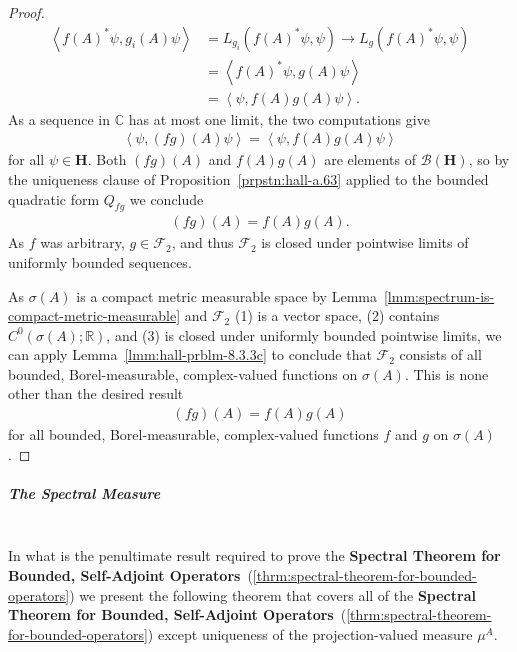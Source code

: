 \begin{proof}
\begin{align}
    \left< f(A)^*\psi, g_i(A)\psi \right> &= L_{g_i}(f(A)^*\psi, \psi) \longrightarrow L_g(f(A)^*\psi, \psi) \\
                &= \left< f(A)^*\psi, g(A)\psi \right> \\
                &= \left< \psi, f(A)g(A)\psi \right>.
\end{align}
As a sequence in $\mathbb{C}$ has at most one limit, the two computations give
\begin{align}
    \left< \psi, (fg)(A)\psi \right> = \left< \psi, f(A)g(A)\psi \right>
\end{align}
for all $\psi \in \mathbf{H}$. Both $(fg)(A)$ and $f(A)g(A)$ are elements of $\mathcal{B}(\mathbf{H})$, so by the uniqueness clause of Proposition~\ref{prpstn:hall-a.63} applied to the bounded quadratic form $Q_{fg}$ we conclude
\begin{align}
    (fg)(A) = f(A)g(A).
\end{align}
As $f$ was arbitrary, $g \in \mathcal{F}_2$, and thus $\mathcal{F}_2$ is closed under pointwise limits of uniformly bounded sequences.

As $\sigma(A)$ is a compact metric measurable space by Lemma~\ref{lmm:spectrum-is-compact-metric-measurable} and $\mathcal{F}_2$ (1) is a vector space, (2) contains $C^0(\sigma(A); \mathbb{R})$, and (3) is closed under uniformly bounded pointwise limits, we can apply Lemma~\ref{lmm:hall-prblm-8.3.3c} to conclude that $\mathcal{F}_2$ consists of all bounded, Borel-measurable, complex-valued functions on $\sigma(A)$. This is none other than the desired result
\begin{align}
    (fg)(A) = f(A)g(A)
\end{align}
for all bounded, Borel-measurable, complex-valued functions $f$ and $g$ on $\sigma(A)$.
\end{proof}

\subparagraph{The Spectral Measure}\mbox{}\\
In what is the penultimate result required to prove the \textbf{Spectral Theorem for Bounded, Self-Adjoint Operators}~(\ref{thrm:spectral-theorem-for-bounded-operators}) we present the following theorem that covers all of the \textbf{Spectral Theorem for Bounded, Self-Adjoint Operators}~(\ref{thrm:spectral-theorem-for-bounded-operators}) except uniqueness of the projection-valued measure $\mu^A$.

